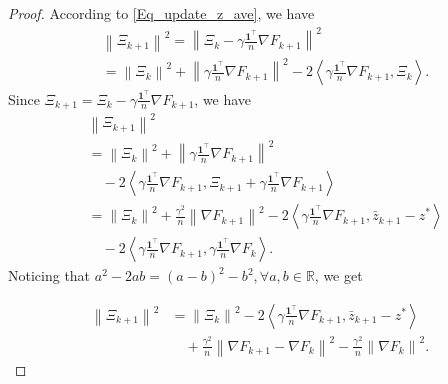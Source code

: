 \documentclass[10pt,a4paper]{amsart}
\begin{document}
\begin{proof}
According to \eqref{Eq_update_z_ave}, we have
\begin{equation*}
\begin{aligned}
&\left\| \varXi _{k+1} \right\| ^2
=\left\| \varXi _k-\gamma \frac{\mathbf{1}^{\top}}{n}\nabla F_{k+1} \right\| ^2
\\
&=\left\| \varXi _k \right\| ^2+\left\| \gamma \frac{\mathbf{1}^{\top}}{n}\nabla F_{k+1} \right\| ^2-2\left< \gamma \frac{\mathbf{1}^{\top}}{n}\nabla F_{k+1}, \varXi _k \right> .
\end{aligned}
\end{equation*}
Since $\varXi _{k+1}=\varXi _k-\gamma \frac{\mathbf{1}^{\top}}{n}\nabla F_{k+1}$, we have
\begin{equation*}
\begin{aligned}
&\left\| \varXi _{k+1} \right\| ^2
\\
&=\left\| \varXi _k \right\| ^2+\left\| \gamma \frac{\mathbf{1}^{\top}}{n}\nabla F_{k+1} \right\| ^2
\\
&\quad-2\left< \gamma \frac{\mathbf{1}^{\top}}{n}\nabla F_{k+1}, \varXi _{k+1}+\gamma \frac{\mathbf{1}^{\top}}{n}\nabla F_{k+1} \right> 
\\
&=\left\| \varXi _k \right\| ^2+\frac{\gamma ^2}{n}\left\| \nabla F_{k+1} \right\| ^2-2\left< \gamma \frac{\mathbf{1}^{\top}}{n}\nabla F_{k+1},\bar{z}_{k+1}-z^* \right> 
\\
&\quad-2\left< \gamma \frac{\mathbf{1}^{\top}}{n}\nabla F_{k+1},\gamma \frac{\mathbf{1}^{\top}}{n}\nabla F_k \right>.
\end{aligned}
\end{equation*}
Noticing that $a^2-2ab=\left( a-b \right) ^2-b^2, \forall a,b\in \mathbb{R} $, we get

\begin{equation}\label{Eq_Desc_1}
\begin{aligned}
\left\| \varXi _{k+1} \right\| ^2
&=\left\| \varXi _k \right\| ^2-2\left< \gamma \frac{\mathbf{1}^{\top}}{n}\nabla F_{k+1},\bar{z}_{k+1}-z^* \right> 
\\
&\quad  +\frac{\gamma ^2}{n}\left\| \nabla F_{k+1}-\nabla F_k \right\| ^2-\frac{\gamma ^2}{n}\left\| \nabla F_k \right\| ^2.
\end{aligned}
\end{equation}


\end{proof}
\end{document}
